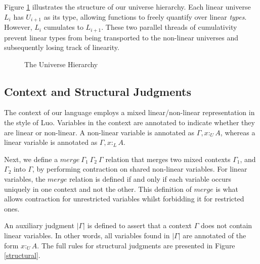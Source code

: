\documentclass[sigplan,screen,review,anonymous]{acmart}
\newcommand{\pure}[1]{|#1|}
\newcommand{\utype}{:_{\scriptscriptstyle U}}
\newcommand{\ltype}{:_{\scriptscriptstyle L}}
\newcommand{\mrg}[3]{merge\ {#1}\ {#2}\ {#3}}
\begin{document}
Figure \ref{universe} illustrates the structure of our universe hierarchy. Each linear universe $L_i$ has $U_{i+1}$ as its type, allowing functions to freely quantify over linear \textit{types}. However, $L_i$ cumulates to $L_{i+1}$. These two parallel threads of cumulativity prevent linear types from being transported to the non-linear universes and subsequently losing track of linearity.

\begin{figure}[h]
  \caption{The Universe Hierarchy}
  \vspace{1em}
  \centering
  \label{universe}
  \Description{}
\end{figure}

\subsection{Context and Structural Judgments}
The context of our language employs a mixed linear/non-linear representation in the style of Luo\cite{luo}. Variables in the context are annotated to indicate whether they are linear or non-linear. A non-linear variable is annotated as $\Gamma, x \utype A$, whereas a linear variable is annotated as $\Gamma, x \ltype A$.

Next, we define a $\mrg{\Gamma_1}{\Gamma_2}{\Gamma}$ relation that merges two mixed contexts $\Gamma_1$, and $\Gamma_2$ into $\Gamma$, by performing contraction on shared non-linear variables. For linear variables, the $merge$ relation is defined if and only if each variable occurs uniquely in one context and not the other. This definition of $merge$ is what allows contraction for unrestricted variables whilst forbidding it for restricted ones.

An auxiliary judgment $\pure{\Gamma}$ is defined to assert that a context $\Gamma$ does not contain linear variables. In other words, all variables found in $\pure{\Gamma}$ are annotated of the form $x \utype A$. The full rules for structural judgments are presented in Figure \ref{structural}.
\end{document}
